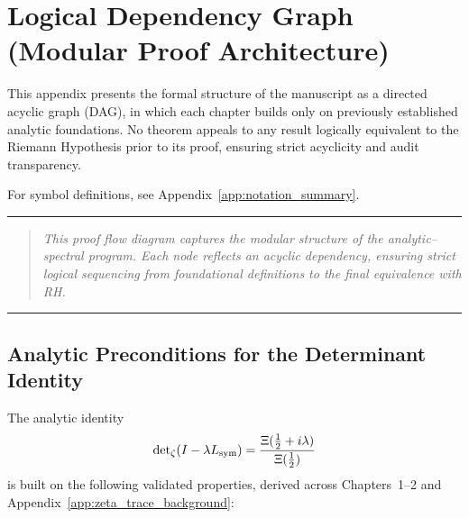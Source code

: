 \section{Logical Dependency Graph (Modular Proof Architecture)}
\label{app:dependency_graph}

\noindent
This appendix presents the formal structure of the manuscript as a directed acyclic graph (DAG), in which each chapter builds only on previously established analytic foundations. No theorem appeals to any result logically equivalent to the Riemann Hypothesis prior to its proof, ensuring strict acyclicity and audit transparency.

For symbol definitions, see Appendix~\ref{app:notation_summary}.

\vspace{1ex}
\hrule
\vspace{1ex}

\begin{quote}
\textit{This proof flow diagram captures the modular structure of the analytic–spectral program. Each node reflects an acyclic dependency, ensuring strict logical sequencing from foundational definitions to the final equivalence with RH.}
\end{quote}

\vspace{1ex}
\hrule
\vspace{2ex}

\subsection*{Analytic Preconditions for the Determinant Identity}
\label{dag:determinant_preconditions}

The analytic identity
\[
\det\nolimits_{\zeta}(I - \lambda L_{\mathrm{sym}}) = \frac{\Xi(\tfrac{1}{2} + i\lambda)}{\Xi(\tfrac{1}{2})}
\]
is built on the following validated properties, derived across Chapters~1–2 and Appendix~\ref{app:zeta_trace_background}:

